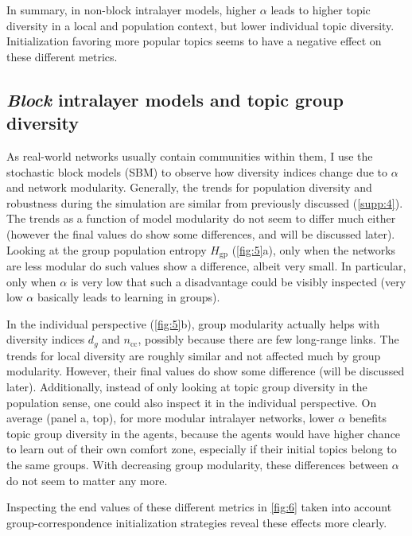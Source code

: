 

In summary, in non-block intralayer models, higher $\alpha$ leads to higher topic diversity in a local and population context, but lower individual topic diversity. Initialization favoring more popular topics seems to have a negative effect on these different metrics.


\subsection{\textit{Block} intralayer models and topic group diversity}

As real-world networks usually contain communities within them, I use the stochastic block models (SBM) to observe how diversity indices change due to $\alpha$ and network modularity. Generally, the trends for population diversity and robustness during the simulation are similar from previously discussed (\ref{supp:4}). The trends as a function of model modularity do not seem to differ much either (however the final values do show some differences, and will be discussed later). Looking at the group population entropy $H_{\mathrm{gp}}$ (\ref{fig:5}a), only when the networks are less modular do such values show a difference, albeit very small. In particular, only when $\alpha$ is very low that such a disadvantage could be visibly inspected (very low $\alpha$ basically leads to learning in groups).

In the individual perspective (\ref{fig:5}b), group modularity actually helps with diversity indices $d_g$ and $n_{\mathrm{cc}}$, possibly because there are few long-range links. The trends for local diversity are roughly similar and not affected much by group modularity. However, their final values do show some difference (will be discussed later). Additionally, instead of only looking at topic group diversity in the population sense, one could also inspect it in the individual perspective. On average (panel a, top), for more modular intralayer networks, lower $\alpha$ benefits topic group diversity in the agents, because the agents would have higher chance to learn out of their own comfort zone, especially if their initial topics belong to the same groups. With decreasing group modularity, these differences between $\alpha$ do not seem to matter any more.



Inspecting the end values of these different metrics in \ref{fig:6} taken into account group-correspondence initialization strategies reveal these effects more clearly.

